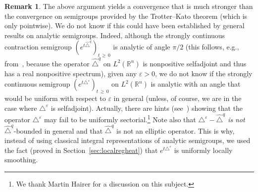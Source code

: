 \documentclass[10pt]{amsart}
\theoremstyle{definition}\newtheorem{defi}[theo]{Definition}\newtheorem{rema}[theo]{Remark}\newtheorem{exam}[theo]{Example}\newtheorem{exem}[theo]{Example}\newtheorem{nota}[theo]{Notation}
\newcommand*\R{\mathbb{R}}
\renewcommand{\geq}{\geqslant}
\begin{document}
\begin{rema}
The above argument yields a convergence that is much stronger than the convergence on semigroups provided by the Trotter--Kato theorem (which is only pointwise). We do not know if this could have been established by general results on analytic semigroups. Indeed, although the strongly continuous contraction semigroup $(e^{t\widehat{\triangle}^{q}})_{t\,\geq\,0}$ is analytic of angle $\pi/2$ (this follows, e.g., from~\cite[Chapter~II, Corollary~4.7]{EngelNagel}, because the operator $\widehat{\triangle}^{q}$ on $L^2(\R^n)$ is nonpositive selfadjoint and thus has a real nonpositive spectrum), given any $\varepsilon>0$, we do not know if the strongly continuous semigroup $(e^{t\triangle^\varepsilon})_{t\,\geq\,0}$ on $L^2(\R^n)$ is analytic with an angle that would be uniform with respect to $\varepsilon$ in general (unless, of course, we are in the case where $\triangle^\varepsilon$ is selfadjoint). Actually, there are hints (see~\cite{EckmannHairer}) showing that the operator $\triangle^\varepsilon$ may fail to be uniformly sectorial.\footnote{We thank Martin Hairer for a discussion on this subject.} Note also that $\triangle^\varepsilon-\widehat{\triangle}^{q}$ \emph{is not} $\widehat{\triangle}^{q}$-bounded in general and that $\widehat{\triangle}^{q}$ is not an elliptic operator. This is why, instead of using classical integral representations of analytic semigroups, we used the fact (proved in Section~\ref{sec:localregheat}) that $e^{t\triangle^\varepsilon}$ is uniformly locally smoothing.
\end{rema}
\end{document}
